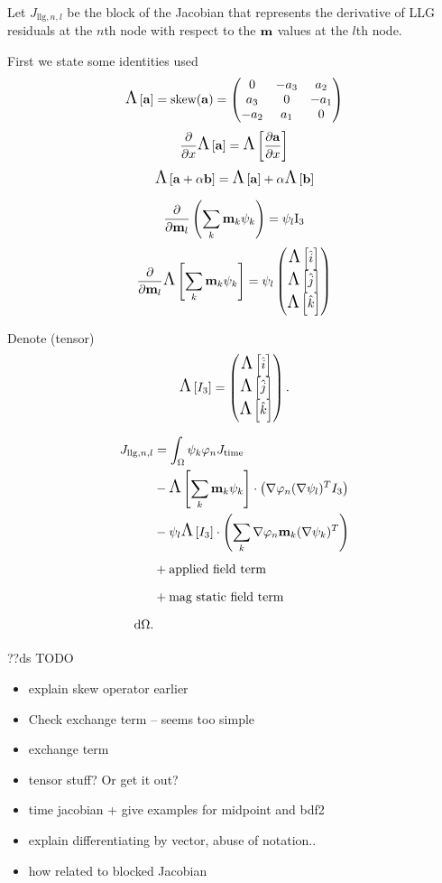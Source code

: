 Let $J_{\text{llg},n,l}$ be the block of the Jacobian that represents the derivative of LLG residuals at the $n$th node with respect to the $\mv$ values at the $l$th node.

First we state some identities used
\begin{equation}
  \skewm{\av} = \text{skew}(\av) =
  \begin{pmatrix}
    0 & -a_3 & a_2 \\
    a_3 & 0 & -a_1 \\
    -a_2 & a_1 & 0
  \end{pmatrix}
\end{equation}
\begin{equation}
  \pd{}{x} \skewm{\av} = \skewm{ \pd{\av}{x} }
\end{equation}
\begin{equation}
  \skewm{\av + \alpha \bv} = \skewm{\av} + \alpha \skewm{\bv}
\end{equation}

\begin{equation}
  \pd{}{\mv_l} \left( \sum_k \mv_k \sk \right) = \sbf_l \text{I}_3
\end{equation}
\begin{equation}
  \pd{}{\mv_l} \skewm{ \sum_k \mv_k \sk } = \sbf_l
  \threevec{\skewm{\iv}}{\skewm{\jv}}{\skewm{\kv}}
\end{equation}

Denote (tensor)
\[
\skewm{I_3} = \threevec{\skewm{\iv}}{\skewm{\jv}}{\skewm{\kv}}.
\]

\begin{align}
  J_{\text{llg},n,l} &= \int_{\magd} \sk \tn J_\text{time} \\
  &- \skewm{\sum_k \mv_k \sk} \cdot \left( \grad \tn (\grad \sbf_l)^T I_3 \right) \\
  &- \sbf_l \skewm{I_3} \cdot \left( \sum_k \grad \tn \mv_k (\grad \sk)^T \right) \\
  &+ \text{applied field term} \\
  &+ \text{mag static field term} \\
  \d \magd.
\end{align}

??ds TODO
\begin{itemize}
\item explain skew operator earlier
\item Check exchange term -- seems too simple
\item exchange term
\item tensor stuff? Or get it out?
\item time jacobian + give examples for midpoint and bdf2
\item explain differentiating by vector, abuse of notation..
\item how related to blocked Jacobian
\end{itemize}



